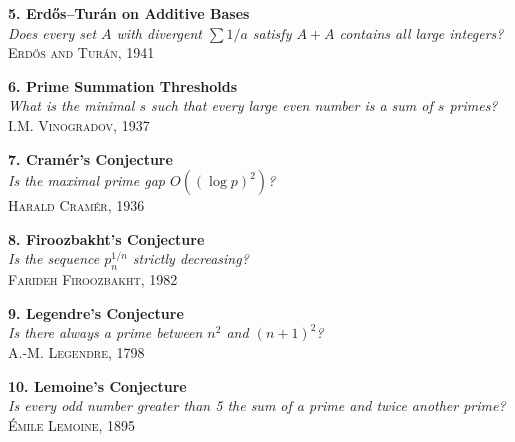 \begin{center}
\begin{tcolorbox}[
    colback=gray!2,
    colframe=gray!60,
    boxrule=0.4pt,
    width=\textwidth,
    arc=1pt,
    left=6pt,
    right=6pt,
    top=6pt,
    bottom=6pt,
    shadow={0mm}{-0.5mm}{0mm}{gray!40}
  ]
  \noindent\begin{minipage}{0.44\textwidth}
    \textbf{5. Erdős–Turán on Additive Bases}\\
    \emph{Does every set \(A\) with divergent \(\sum 1/a\) satisfy \(A + A\) contains all large integers?}\\
    \hfill\textsc{Erdős and Turán, 1941}
  \end{minipage}\hfill
  \begin{minipage}{0.44\textwidth}
    \textbf{6. Prime Summation Thresholds}\\
    \emph{What is the minimal \(s\) such that every large even number is a sum of \(s\) primes?}\\
    \hfill\textsc{I.M. Vinogradov, 1937}
  \end{minipage}

  \vspace{2em}

  \noindent\begin{minipage}{0.44\textwidth}
    \textbf{7. Cramér’s Conjecture}\\
    \emph{Is the maximal prime gap \(O((\log p)^2)\)?}\\
    \hfill\textsc{Harald Cramér, 1936}
  \end{minipage}\hfill
  \begin{minipage}{0.44\textwidth}
    \textbf{8. Firoozbakht’s Conjecture}\\
    \emph{Is the sequence \(p_n^{1/n}\) strictly decreasing?}\\
    \hfill\textsc{Farideh Firoozbakht, 1982}
  \end{minipage}

  \vspace{2em}

  \noindent\begin{minipage}{0.44\textwidth}
    \textbf{9. Legendre’s Conjecture}\\
    \emph{Is there always a prime between \(n^2\) and \((n+1)^2\)?}\\
    \hfill\textsc{A.-M. Legendre, 1798}
  \end{minipage}\hfill
  \begin{minipage}{0.44\textwidth}
    \textbf{10. Lemoine’s Conjecture}\\
    \emph{Is every odd number greater than 5 the sum of a prime and twice another prime?}\\
    \hfill\textsc{Émile Lemoine, 1895}
  \end{minipage}


\end{tcolorbox}
\end{center}
